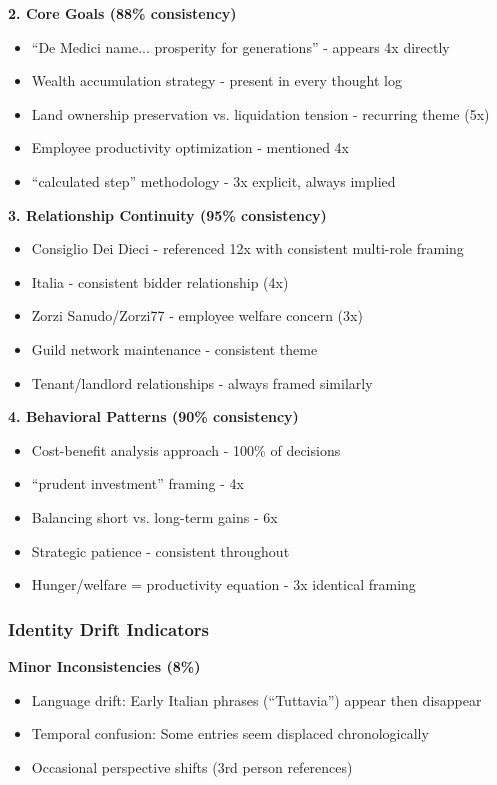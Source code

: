 \documentclass[11pt,a4paper]{article}
\begin{document}
\textbf{2. Core Goals (88\% consistency)}
\begin{itemize}
\item ``De Medici name... prosperity for generations'' - appears 4x directly
\item Wealth accumulation strategy - present in every thought log
\item Land ownership preservation vs. liquidation tension - recurring theme (5x)
\item Employee productivity optimization - mentioned 4x
\item ``calculated step'' methodology - 3x explicit, always implied
\end{itemize}

\textbf{3. Relationship Continuity (95\% consistency)}
\begin{itemize}
\item Consiglio Dei Dieci - referenced 12x with consistent multi-role framing
\item Italia - consistent bidder relationship (4x)
\item Zorzi Sanudo/Zorzi77 - employee welfare concern (3x)
\item Guild network maintenance - consistent theme
\item Tenant/landlord relationships - always framed similarly
\end{itemize}

\textbf{4. Behavioral Patterns (90\% consistency)}
\begin{itemize}
\item Cost-benefit analysis approach - 100\% of decisions
\item ``prudent investment'' framing - 4x
\item Balancing short vs. long-term gains - 6x
\item Strategic patience - consistent throughout
\item Hunger/welfare = productivity equation - 3x identical framing
\end{itemize}

\subsubsection{Identity Drift Indicators}

\textbf{Minor Inconsistencies (8\%)}
\begin{itemize}
\item Language drift: Early Italian phrases (``Tuttavia'') appear then disappear
\item Temporal confusion: Some entries seem displaced chronologically
\item Occasional perspective shifts (3rd person references)
\end{itemize}
\end{document}

